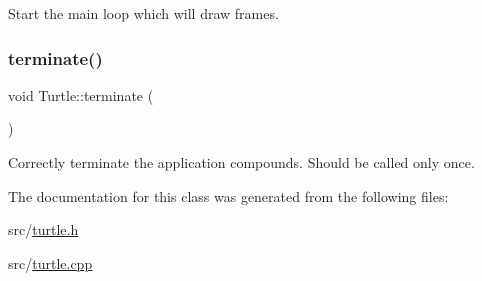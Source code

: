 Start the main loop which will draw frames. 

\mbox{\label{classTurtle_a42152a0f5631a00428477cbffa8476e1}} 
\subsubsection{\texorpdfstring{terminate()}{terminate()}}
{\footnotesize\ttfamily void Turtle\+::terminate (\begin{DoxyParamCaption}{ }\end{DoxyParamCaption})}



Correctly terminate the application compounds. Should be called only once. 



The documentation for this class was generated from the following files\+:\begin{DoxyCompactItemize}
\item 
src/\hyperlink{turtle_8h}{turtle.\+h}\item 
src/\hyperlink{turtle_8cpp}{turtle.\+cpp}\end{DoxyCompactItemize}
